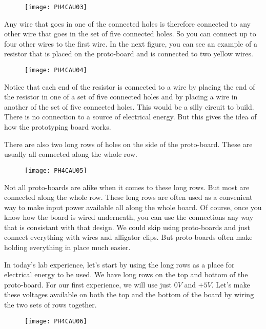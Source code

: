 \begin{figure}[h!]
	\centering
	\texttt{[image: PH4CAU03]}
\end{figure} 

Any wire that goes in one of the
connected holes is therefore connected to any other wire that goes in the
set of five connected holes. So you can connect up to four other wires to
the first wire. In the next figure, you can see an example of a resistor
that is placed on the proto-board and is connected to two yellow wires. 

\begin{figure}[h!]
	\centering
	\texttt{[image: PH4CAU04]}
\end{figure}

Notice that each end of the
resistor is connected to a wire by placing the end of the resistor in one of
a set of five connected holes and by placing a wire in another of the set of
five connected holes. This would be a silly circuit to build. There is no
connection to a source of electrical energy. But this gives the idea of how
the prototyping board works.

There are also two long rows of holes on the side of the proto-board. These
are usually all connected along the whole row. 

\begin{figure}[h!]
	\centering
	\texttt{[image: PH4CAU05]}
\end{figure}

Not all proto-boards are alike
when it comes to these long rows. But most are connected along the whole
row. These long rows are often used as a convenient way to make input power
available all along the whole board. Of course, once you know how the board
is wired underneath, you can use the connections any way that is consistant
with that design. We could skip using proto-boards and just connect
everything with wires and alligator clips. But proto-boards often make
holding everything in place much easier.

In today's lab experience, let's start by using the long rows as a place for
electrical energy to be used. We have long rows on the top and bottom of the
proto-board. For our first experience, we will use just $0\unit{V}$ and $+5%
\unit{V}.$ Let's make these voltages available on both the top and the
bottom of the board by wiring the two sets of rows together. 

\begin{figure}[h!]
	\centering
	\texttt{[image: PH4CAU06]}
\end{figure}

